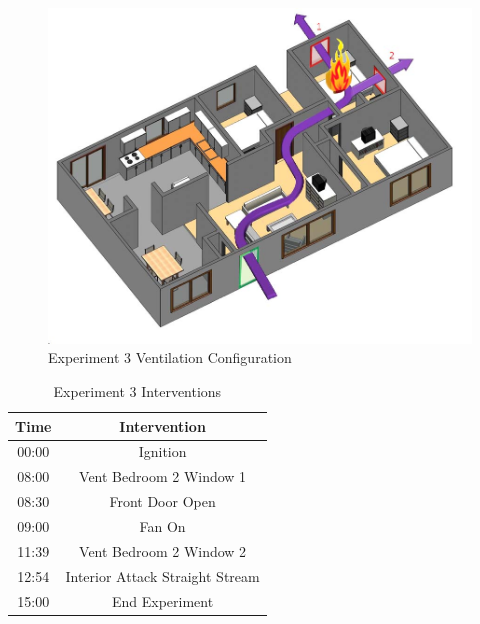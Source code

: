 \documentclass{article}
\begin{document}
 \begin{figure}[h!]
 	\centering
 	\includegraphics[width=5in]{0_Images/FireExperiments/Single_Story/Experiment_3.jpg}
 	\caption{Experiment 3 Ventilation Configuration}
 	\label{fig:Exp3VentConfig}
 \end{figure}

\begin{table}[H]
	\centering
	\caption{Experiment 3 Interventions}
	\begin{tabular}{|c|c|} 
		\hline
		Time & Intervention \\ \hline \hline
		00:00 & Ignition \\ \hline
		08:00 & Vent Bedroom 2 Window 1 \\ \hline
		08:30 & Front Door Open \\ \hline
		09:00 & Fan On \\ \hline
		11:39 & Vent Bedroom 2 Window 2 \\ \hline
		12:54 & Interior Attack Straight Stream \\ \hline
		15:00 & End Experiment \\ \hline
	\end{tabular}
	\label{Table:Exp3Interventions}
\end{table}
\end{document}
